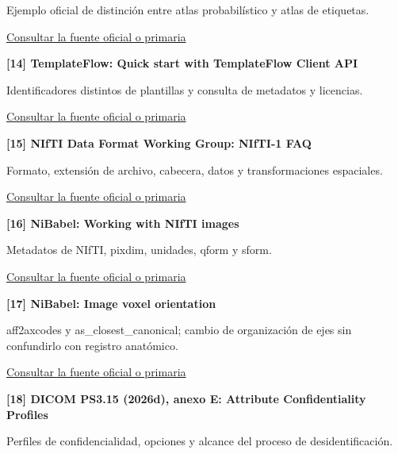 Ejemplo oficial de distinción entre atlas probabilístico y atlas de etiquetas.


\href{https://nilearn.github.io/stable/modules/generated/nilearn.datasets.fetch_atlas_harvard_oxford.html}{Consultar la fuente oficial o primaria}\par\medskip

\hypertarget{refR14}{}\textbf{[14] TemplateFlow: Quick start with TemplateFlow Client API}\par

Identificadores distintos de plantillas y consulta de metadatos y licencias.


\href{https://www.templateflow.org/python-client/master/notebooks/01_quickstart.html}{Consultar la fuente oficial o primaria}\par\medskip

\hypertarget{refR15}{}\textbf{[15] NIfTI Data Format Working Group: NIfTI-1 FAQ}\par

Formato, extensión de archivo, cabecera, datos y transformaciones espaciales.


\href{https://nifti.nimh.nih.gov/nifti-1/documentation/faq/}{Consultar la fuente oficial o primaria}\par\medskip

\hypertarget{refR16}{}\textbf{[16] NiBabel: Working with NIfTI images}\par

Metadatos de NIfTI, pixdim, unidades, qform y sform.


\href{https://nipy.org/nibabel/nifti_images.html}{Consultar la fuente oficial o primaria}\par\medskip

\hypertarget{refR17}{}\textbf{[17] NiBabel: Image voxel orientation}\par

aff2axcodes y as\_closest\_canonical; cambio de organización de ejes sin confundirlo con registro anatómico.


\href{https://nipy.org/nibabel/image_orientation.html}{Consultar la fuente oficial o primaria}\par\medskip

\hypertarget{refR18}{}\textbf{[18] DICOM PS3.15 (2026d), anexo E: Attribute Confidentiality Profiles}\par

Perfiles de confidencialidad, opciones y alcance del proceso de desidentificación.


